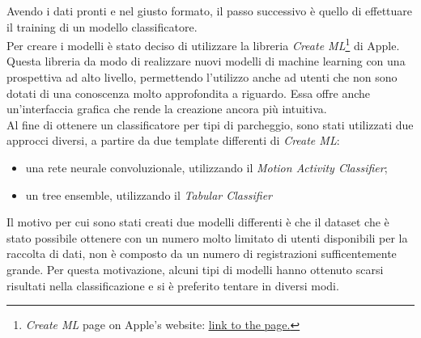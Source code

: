 Avendo i dati pronti e nel giusto formato, il passo successivo è quello di effettuare il 
training di un modello classificatore.\\
Per creare i modelli è stato deciso di utilizzare la libreria \emph{Create ML}\footnote{
\emph{Create ML} page on Apple's website: 
\href{https://developer.apple.com/documentation/createml}{\underline{link to the page.}}}
\cite{custom_core_ml_models_create_ml} di Apple.
Questa libreria da modo di realizzare nuovi modelli di machine learning con una prospettiva
ad alto livello, permettendo l'utilizzo anche ad utenti che non sono dotati di una conoscenza
molto approfondita a riguardo. Essa offre anche un'interfaccia grafica che rende la creazione 
ancora più intuitiva.\\
Al fine di ottenere un classificatore per tipi di parcheggio, sono stati utilizzati due 
approcci diversi, a partire da due template differenti di \emph{Create ML}:
\begin{itemize}
    \item una rete neurale convoluzionale, utilizzando il \emph{Motion Activity Classifier};
    \item un tree ensemble, utilizzando il \emph{Tabular Classifier}
\end{itemize}
Il motivo per cui sono stati creati due modelli differenti è che il dataset che è stato 
possibile ottenere con un numero molto limitato di utenti disponibili per la raccolta di 
dati, non è composto da un numero di registrazioni sufficentemente grande. Per
questa motivazione, alcuni tipi di modelli hanno ottenuto scarsi risultati nella 
classificazione e si è preferito tentare in diversi modi.

